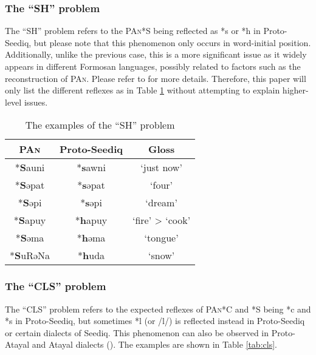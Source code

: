 \documentclass[12pt]{article}
\newcommand{\pan}{\textsc{PAn}\xspace}
\newcommand{\psedf}{Proto-Seediq\xspace}
\begin{document}
\subsubsection{The ``SH'' problem}

The ``SH'' problem refers to the \pan *S being reflected as *s or *h in \psedf, but please note that this phenomenon only occurs in word-initial position. Additionally, unlike the previous case, this is a more significant issue as it widely appears in different Formosan languages, possibly related to factors such as the reconstruction of \pan. Please refer to \textcite{tsuchida1976tsouic, ross2015coronals} for more details. Therefore, this paper will only list the different reflexes as in Table \ref{tab:sh} without attempting to explain higher-level issues.

\begin{table}[!htbp]
\centering
\caption{The examples of the ``SH'' problem}
\label{tab:sh}
\begin{tabular}{ccc}
\hline
\pan    & \psedf & Gloss           \\ \hline
*\textbf{S}auni  & *\textbf{s}awni & `just now'      \\
*\textbf{S}əpat  & *\textbf{s}əpat & `four'          \\
*\textbf{S}əpi   & *\textbf{s}əpi  & `dream'         \\
*\textbf{S}apuy  & *\textbf{h}apuy & `fire' > `cook' \\
*\textbf{S}əma   & *\textbf{h}əma  & `tongue'        \\
*\textbf{S}uRəNa & *\textbf{h}uda  & `snow'          \\ \hline
\end{tabular}
\end{table}

\subsubsection{The ``CLS'' problem}

The ``CLS'' problem refers to the expected reflexes of \pan *C and *S being *c and *s in \psedf, but sometimes *l (or /l/) is reflected instead in  \psedf or certain dialects of Seediq. This phenomenon can also be observed in Proto-Atayal and Atayal dialects (\cite[173]{goderich2020phd}). The examples are shown in Table \ref{tab:cls}.
\end{document}
